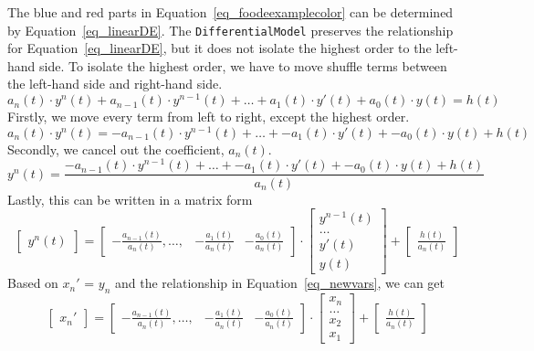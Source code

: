 The blue and red parts in Equation~\ref{eq_foodeexamplecolor} can be determined by Equation~\ref{eq_linearDE}. The \verb|DifferentialModel| preserves the relationship for Equation~\ref{eq_linearDE}, but it does not isolate the highest order to the left-hand side. To isolate the highest order, we have to move shuffle terms between the left-hand side and right-hand side. 
\begin{equation}
	a_n(t) \cdot y^n(t) + a_{n-1}(t) \cdot y^{n-1}(t) + \dots + a_1(t) \cdot y'(t) + a_0(t) \cdot y(t) = h(t) \nonumber
\end{equation}
Firstly, we move every term from left to right, except the highest order. 
\begin{equation}
	a_n(t) \cdot y^n(t)  = -a_{n-1}(t) \cdot y^{n-1}(t) + \dots + -a_1(t) \cdot y'(t) + -a_0(t) \cdot y(t) + h(t) \nonumber
\end{equation}
Secondly, we cancel out the coefficient, $a_n(t)$.
\begin{equation}
	y^n(t)  = \frac{-a_{n-1}(t) \cdot y^{n-1}(t) + \dots + -a_1(t) \cdot y'(t) + -a_0(t) \cdot y(t) + h(t)}{a_n(t)} \nonumber
\end{equation}
Lastly, this can be written in a matrix form
\begin{equation} 
  \begin{bmatrix}
		y^n(t)
	\end{bmatrix}
  = 
	\begin{bmatrix}
		-\frac{a_{n-1}(t)}{a_n(t)}, \dots, & -\frac{a_{1}(t)}{a_n(t)} & -\frac{a_{0}(t)}{a_n(t)}
	\end{bmatrix}
	\cdot
	\begin{bmatrix}
		y^{n-1}(t) \\
		\dots \\
    y'(t) \\
		y(t)  
	\end{bmatrix}
	+
	\begin{bmatrix}
		\frac{h(t)}{a_n(t)}
	\end{bmatrix}
  \nonumber
\end{equation}
Based on $x_{n}'$ = $y_{n}$ and the relationship in Equation~\ref{eq_newvars}, we can get 
\begin{equation}
  \begin{bmatrix}
		x_{n}'
	\end{bmatrix}
  = 
	\begin{bmatrix}
		-\frac{a_{n-1}(t)}{a_n(t)}, \dots, & -\frac{a_{1}(t)}{a_n(t)} & -\frac{a_{0}(t)}{a_n(t)}
	\end{bmatrix}
	\cdot
	\begin{bmatrix}
		x_{n} \\
		\dots \\
    x_{2} \\
		x_{1}  
	\end{bmatrix}
	+
	\begin{bmatrix}
		\frac{h(t)}{a_n(t)}
	\end{bmatrix}
  \nonumber
\end{equation}
